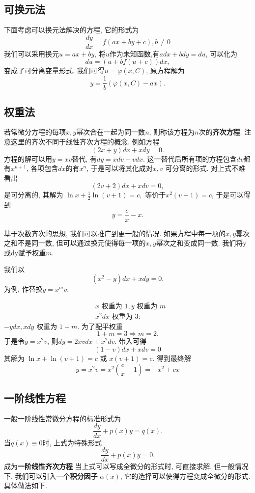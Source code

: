 \subsection{可换元法}
下面考虑可以换元法解决的方程, 它的形式为
\begin{equation}
    \frac{dy}{dx} = f(a x + by + c), b\neq 0
\end{equation}
我们可以采用换元$u = ax + by$, 将$u$作为未知函数,有$a dx + b dy = du $,
可以化为
\begin{equation}
    du  = ( a + b f(u+c) ) dx,
\end{equation}
变成了可分离变量形式. 我们可得$u  = \varphi (x, C)$, 原方程解为
\begin{equation}
    y = \frac{1}{b} \left(\varphi(x, C) - a x \right).
\end{equation}

\subsection{权重法}
若常微分方程的每项$x, y$幂次合在一起为同一数$n$, 则称该方程为$n$次的\textbf{齐次方程}. 注意这里的齐次不同于线性齐次方程的概念.
例如方程
\begin{equation}
    (2x + y) dx + x dy = 0.
\end{equation}
方程的解可以用$y = x v$替代, 有$dy = x dv + v dx$.
这一替代后所有项的方程包含$dv$都有$x^{n+1}$, 各项包含$dx$的有$x^n$, 于是可以将其化成对$x, v$
可分离的形式.
对上式不难看出
$$
(2 v + 2 ) dx + x dv  = 0,
$$
是可分离的, 其解为 $\ln x + \frac{1}{2} \ln (v + 1) = c, $ 等价于$x^2 (v + 1) = c$, 于是可以得到
$$
 y = \frac{c}{x} - x.
$$

基于次数齐次的思想, 我们可以推广到更一般的情况. 如果方程中每一项的$x, y$幂次之和不是同一数,
但可以通过换元使得每一项的$x, y$幂次之和变成同一数. 我们将y或dy赋予权重$m$. 

我们以$$ \left(x^2-y\right) d x+x d y=0 .$$为例, 作替换$y=x^{m}v$.

$$
\begin{aligned}
& x \text { 权重为 } 1, y\text { 权重为 }m \\
& x^2 d x \text { 权重为 } 3:
\end{aligned}
$$
$-ydx,  x d y$ 权重为 $1+m$.
为了配平权重
$$
1+m=3 \Rightarrow m=2.
$$
于是令$y=x^2 v$, 则$dy = 2 x v d x + x^2 d v$.
带入可得
$$
(1-v) d x+x d v=0
$$
其解为 $ \ln x+\ln (v+1)=c$ 或 $x(v+1)=c$.
得到最终解
$$
    y=x^2 v=x^2\left(\frac{c}{x}-1\right) = -x^2+c x 
$$

\subsection{一阶线性方程}
一般一阶线性常微分方程的标准形式为
\begin{equation}
    \frac{d y}{d x}+p(x) y=q(x).
\end{equation}
当$q(x) \equiv 0$时, 上式为特殊形式
\begin{equation}
    \frac{d y}{d x}+p(x) y = 0.
\end{equation}
成为\textbf{一阶线性齐次方程}
当上式可以写成全微分的形式时, 可直接求解. 但一般情况下, 我们可以引入一个\textbf{积分因子} $\alpha(x)$,
它的选择可以使得方程变成全微分的形式. 具体做法如下.

